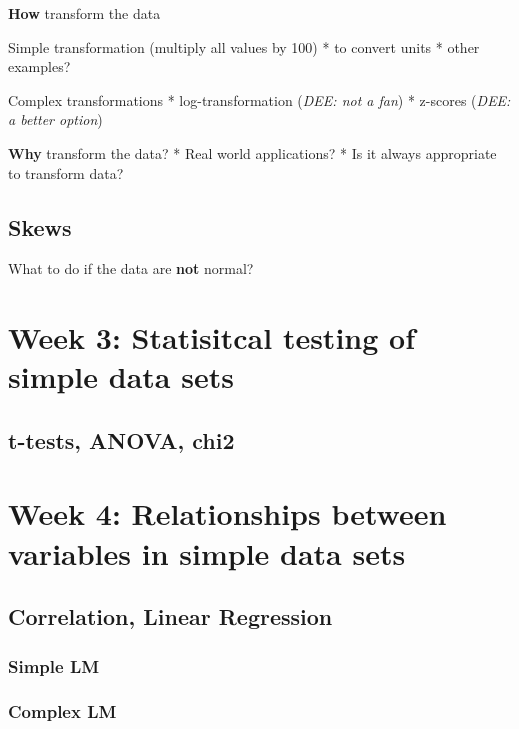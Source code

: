 \documentclass[
]{book}
\begin{document}
\textbf{How} transform the data

Simple transformation (multiply all values by 100)
* to convert units
* other examples?

Complex transformations
* log-transformation (\emph{DEE: not a fan})
* z-scores (\emph{DEE: a better option})

\textbf{Why} transform the data?
* Real world applications?
* Is it always appropriate to transform data?

\hypertarget{skews}{%
\subsection{Skews}\label{skews}}

What to do if the data are \textbf{not} normal?

\hypertarget{week-3-statisitcal-testing-of-simple-data-sets-1}{%
\section{Week 3: Statisitcal testing of simple data sets}\label{week-3-statisitcal-testing-of-simple-data-sets-1}}

\hypertarget{t-tests-anova-chi2}{%
\subsection{t-tests, ANOVA, chi2}\label{t-tests-anova-chi2}}

\hypertarget{week-4-relationships-between-variables-in-simple-data-sets}{%
\section{Week 4: Relationships between variables in simple data sets}\label{week-4-relationships-between-variables-in-simple-data-sets}}

\hypertarget{correlation-linear-regression}{%
\subsection{Correlation, Linear Regression}\label{correlation-linear-regression}}

\hypertarget{simple-lm}{%
\subsubsection{Simple LM}\label{simple-lm}}

\hypertarget{complex-lm}{%
\subsubsection{Complex LM}\label{complex-lm}}
\end{document}
